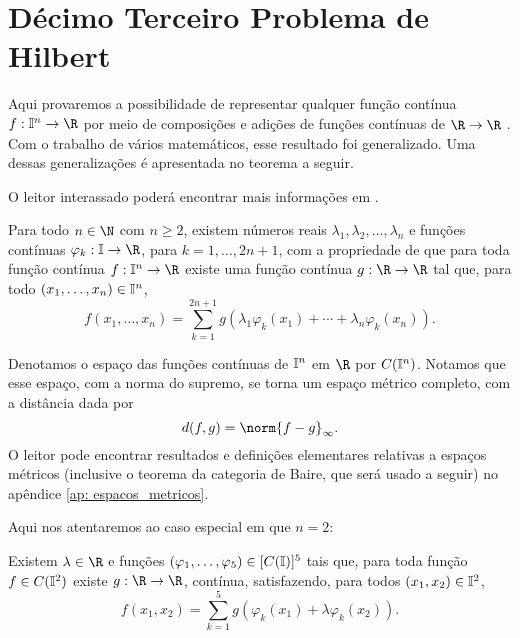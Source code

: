\section{Décimo Terceiro Problema de Hilbert}

Aqui provaremos a possibilidade de representar qualquer função contínua \( f : \I^{ n } \to \R \) por meio de composições e adições de funções contínuas de \( \R \to \R \) .
Com o trabalho de vários matemáticos, esse resultado foi generalizado.
Uma dessas generalizações é apresentada no teorema a seguir.

O leitor interassado poderá encontrar mais informações em \cite{hilbert}.
\begin{teo}
    Para todo \( n \in \N \) com \( n \geq 2 \), existem números reais \( \lambda_{ 1 }, \lambda_{ 2 }, \dots, \lambda_{ n } \) e funções contínuas \( \varphi_{ k } : \I \to \R \), para \( k = 1, \dots, 2n + 1 \), com a propriedade de que para toda função contínua \( f : \I^{ n } \to \R \) existe uma função contínua \( g : \R \to \R \) tal que, para todo \( ( x_{ 1 }, \dots, x_{ n } ) \in \mathbb{I}^{ n } \),
    \begin{equation}
        f(x_{ 1 }, \dots, x_{ n }) =
        \sum_{ k=1 }^{ 2n+1 } g ( \lambda_{ 1 } \varphi_{ k } ( x_{ 1 } )  + \cdots + \lambda_{ n } \varphi_{ k } ( x_{ n } ) )
        \label{eq: kolmogorov_2}
    .\end{equation}
\end{teo}
\begin{rem}
    Denotamos o espaço das funções contínuas de \( \mathbb{I}^{ n } \) em \( \R \) por \( C(\mathbb{I}^{ n }) \).
    Notamos que esse espaço, com a norma do supremo, se torna um espaço métrico completo, com a distância dada por
    \begin{equation}
        d(f, g) = \norm{ f - g }_{ \infty }
    .\end{equation}
    O leitor pode encontrar resultados e definições elementares relativas a espaços métricos (inclusive o teorema da categoria de Baire, que será usado a seguir) no apêndice \ref{ap: espacos_metricos}.
\end{rem}
Aqui nos atentaremos ao caso especial em que \( n = 2 \):
\begin{teo}
    Existem \( \lambda \in \R \) e funções \( ( \varphi_{ 1 }, \dots, \varphi_{ 5 } ) \in [C(\mathbb{I})]^{ 5 } \) tais que, para toda função \( f \in C(\mathbb{I}^{ 2 }) \) existe \( g : \R \to \R \), contínua, satisfazendo, para todos \( ( x_{ 1 }, x_{ 2 } ) \in \mathbb{I}^{ 2 } \), \[
        f ( x_{ 1 }, x_{ 2 } ) =
        \sum_{ k=1 }^{ 5 } g ( \varphi_{ k } ( x_{ 1 } ) + \lambda \varphi_{ k } ( x_{ 2 } ) )
    .\]
    \label{teo: hilbert13}
\end{teo}
